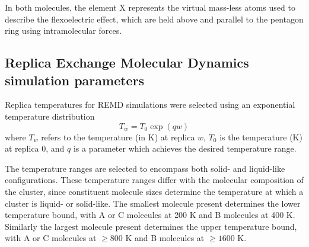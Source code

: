 In both molecules, the element X represents the virtual mass-less atoms used to describe the flexoelectric effect, which are held above and parallel to the pentagon ring using intramolecular forces.

\subsection{Replica Exchange Molecular Dynamics simulation parameters}
\label{secSI:REMDtemps}
%
Replica temperatures for REMD simulations were selected using an exponential temperature distribution
\begin{equation}
\label{eqn:replica_temp_dist}
T_{w} = T_{0}\exp(qw)
\end{equation}
where $T_w$ refers to the temperature (in K) at replica $w$, $T_0$ is the temperature (K) at replica $0$, and $q$ is a parameter which achieves the desired temperature range. 

The temperature ranges are selected to encompass both solid- and liquid-like configurations. These temperature ranges differ with the molecular composition of the cluster, since constituent molecule sizes determine the temperature at which a cluster is liquid- or solid-like. The smallest molecule present determines the lower temperature bound, with A or C molecules at 200 K and B molecules at 400 K. Similarly the largest molecule present determines the upper temperature bound, with A or C molecules at $\ge 800$ K and B molecules at $\ge 1600$ K. 

